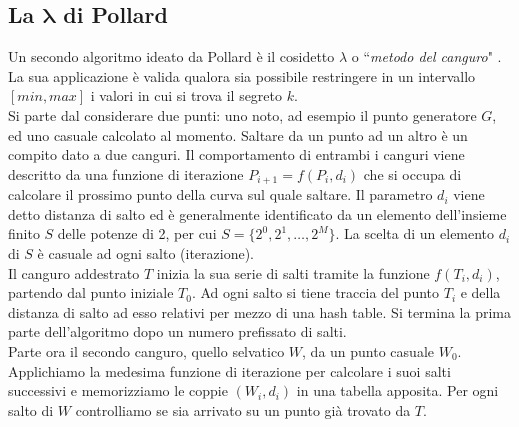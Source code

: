 \documentclass[a4paper,12pt]{tesiinfo}
\begin{document}
\subsection{La \texorpdfstring{$\mathbold{\lambda}$}{l} di Pollard}
Un secondo algoritmo ideato da Pollard \`e il cosidetto $\lambda$ o ``\textit{metodo del canguro}" \cite{pollard el-psy-kongru}. La sua applicazione \`e valida qualora sia possibile restringere in un intervallo $[min, max]$ i valori in cui si trova il segreto $k$.
\\
Si parte dal considerare due punti: uno noto, ad esempio il punto generatore $G$, ed uno casuale calcolato al momento. Saltare da un punto ad un altro \`e un compito dato a due canguri. Il comportamento di entrambi i canguri viene descritto da una funzione di iterazione $P_{i+1}=f(P_i, d_i)$ che si occupa di calcolare il prossimo punto della curva sul quale saltare. 
Il parametro $d_i$ viene detto distanza di salto ed \`e generalmente identificato \cite{el-psy 2} da un elemento dell'insieme finito $S$ delle potenze di 2, per cui $S=\{2^0, 2^1, \ldots, 2^M\}$. La scelta di un elemento $d_i$ di $S$ \`e casuale ad ogni salto (iterazione).
\\
Il canguro addestrato $T$ inizia la sua serie di salti tramite la funzione $f(T_i, d_i)$, partendo dal punto iniziale $T_0$. Ad ogni salto si tiene traccia del punto $T_i$ e della distanza di salto ad esso relativi per mezzo di una hash table. Si termina la prima parte dell'algoritmo dopo un numero prefissato di salti.
\\
Parte ora il secondo canguro, quello selvatico $W$, da un punto casuale $W_0$. Applichiamo la medesima funzione di iterazione per calcolare i suoi salti successivi e memorizziamo le coppie $(W_i, d_i)$ in una tabella apposita. Per ogni salto di $W$ controlliamo se sia arrivato su un punto gi\`a trovato da $T$. 
\\
\end{document}
